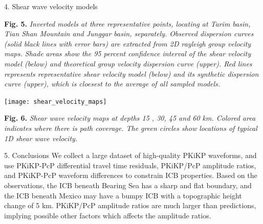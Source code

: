 \documentclass[
    landscape,      %
    paperwidth = 1200mm,
    paperheight = 900mm,
    fontscale = 0.4,
    margin = 1.7cm,
]{baposter}
\begin{document}
\begin{poster}
\begin{posterbox}[column=2 ]{4. Shear wave velocity models}
\begin{center}
\begin{minipage}{0.9\textwidth}
\small
\textbf{Fig. 5.}
\itshape
Inverted models at three representative points, locating at Tarim basin, Tian Shan Mountain and Junggar basin, separately.
Observed dispersion curves (solid black lines with error bars) are extracted from 2D rayleigh group velocity maps.
Shade areas show the 95 percent confidence interval of the shear velocity model (below) and theoretical
group velocity dispersion curve (upper). Red lines represents representative shear velocity model (below)
and its synthetic dispersion curve (upper), which is cloesest to the average of all sampled models.
\end{minipage}
\end{center}



\begin{center}
\texttt{[image: shear\_velocity\_maps]}
\begin{minipage}{0.9\textwidth}
\footnotesize
\vspace{0.2em}
\textbf{Fig. 6.}
\itshape
 Shear wave velocity maps at depths 15 , 30, 45 and 60 km. Colored area indicates where there is path coverage.
 The green circles show locations of typical 1D shear wave velocity.
\end{minipage}
\end{center}

\end{posterbox}

\begin{posterbox}[column=2, below=auto]{5. Conclusions}
We collect a large dataset of high-quality PKiKP waveforms, and use
PKiKP-PcP differential travel time residuals, PKiKP/PcP amplitude ratios,
and PKiKP-PcP waveform differences to constrain ICB properties.
Based on the observations, the ICB beneath Bearing Sea has a sharp and flat
boundary, and the ICB beneath Mexico may have a bumpy ICB with a topographic
height change of 5 km. PKiKP/PcP amplitude ratios are much larger than predictions,
implying possible other factors which affects the amplitude ratios.
\end{posterbox}

\end{poster}
\end{document}

